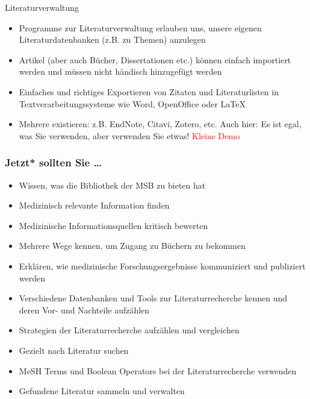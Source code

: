 \documentclass{beamer}
\begin{document}
\begin{frame}{Literaturverwaltung}

\begin{itemize}
    \item 
    Programme zur Literaturverwaltung erlauben uns, unsere eigenen Literaturdatenbanken (z.B. zu Themen) anzulegen
    \item 
    Artikel (aber auch Bücher, Dissertationen etc.) können einfach importiert werden und müssen nicht händisch hinzugefügt werden
    \item 
    Einfaches und richtiges Exportieren von Zitaten und Literaturlisten in Textverarbeitungssysteme wie Word, OpenOffice oder LaTeX
\item 
Mehrere existieren: z.B. EndNote, Citavi, Zotero, etc. Auch hier: Es ist egal, was Sie verwenden, aber verwenden Sie etwas! \pause \textcolor{red}{Kleine Demo}
\end{itemize}


\end{frame}



\begin{frame}

\frametitle{Jetzt* sollten Sie \dots}


\begin{itemize}
\item
Wissen, was die Bibliothek der MSB zu bieten hat
\item 
Medizinisch relevante Information finden
\item 
Medizinische Informationsquellen kritisch bewerten
\item 
Mehrere Wege kennen, um Zugang zu Büchern zu bekommen
\item 
Erklären, wie medizinische Forschungsergebnisse kommuniziert und publiziert werden
\item 
Verschiedene Datenbanken und Tools zur Literaturrecherche kennen und deren Vor- und Nachteile aufzählen
\item 
Strategien der Literaturrecherche aufzählen und vergleichen
\item 
Gezielt nach Literatur suchen
\item 
MeSH Terms und Boolean Operators bei der Literaturrecherche verwenden
\item 
Gefundene Literatur sammeln und verwalten
\end{itemize}

\end{frame}
\end{document}
